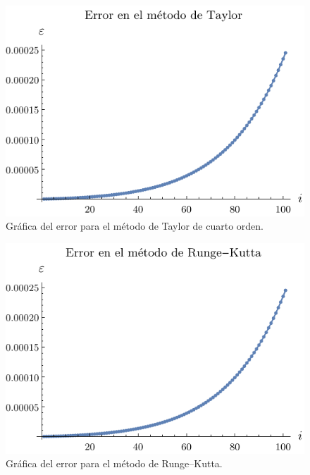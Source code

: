 \documentclass[
    english, spanish, Ce-table, Ce-theorem
]{CabesHW}
\begin{document}
\begin{figure}[H]
    \centering
    \includegraphics{imgs/plot-taylor.pdf}
    \caption{Gráfica del error para el método de Taylor de cuarto orden.}
    \label{fig:taylor}
\end{figure}

\begin{figure}[H]
    \centering
    \includegraphics{imgs/plot-runge_kutta.pdf}
    \caption{Gráfica del error para el método de Runge--Kutta.}
    \label{fig:runge_kutta}
\end{figure}
\end{document}
